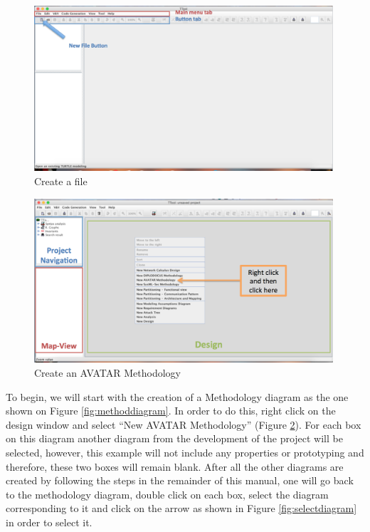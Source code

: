 \documentclass[12pt]{article}
\begin{document}
\begin{figure}[htbp]
\centering
\includegraphics[width=0.99\textwidth]{fig/createfile.png}
\caption{Create a file} \label{fig:createfile}
\end{figure}

\begin{figure}[htbp]
\centering
\includegraphics[width=0.99\textwidth]{fig/createmethod.png}
\caption{Create an AVATAR Methodology} \label{fig:createmethod}
\end{figure}

To begin, we will start with the creation of a Methodology diagram as the one shown on Figure \ref{fig:methoddiagram}. In order to do this, right click on the design window and select “New AVATAR Methodology” (Figure \ref{fig:createmethod}). For each box on this diagram another diagram from the development of the project will be selected, however, this example will not include any properties or prototyping and therefore, these two boxes will remain blank. After all the other diagrams are created by following the steps in the remainder of this manual, one will go back to the methodology diagram, double click on each box, select the diagram corresponding to it and click on the arrow as shown in Figure \ref{fig:selectdiagram} in order to select it. 
\end{document}
